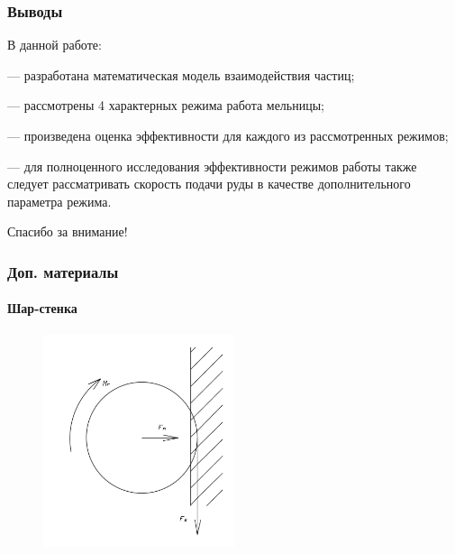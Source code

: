 \documentclass[c]{beamer}  %
\begin{document}
\begin{frame}
\frametitle{Выводы} 
В данной работе:

	--- разработана математическая модель взаимодействия частиц;

	--- рассмотрены 4 характерных режима работа мельницы;

	--- произведена оценка эффективности для каждого из рассмотренных режимов;

	--- для полноценного исследования эффективности режимов работы также следует рассматривать скорость подачи руды в качестве дополнительного параметра режима.

\end{frame}




\begin{frame}
\centering
Спасибо за внимание!
\end{frame}


\begin{frame}
\frametitle{Доп. материалы} 
\framesubtitle{Шар-стенка}

\begin{figure}[h!]
	\centering
	\includegraphics[width=0.5\textwidth]{ball_wall}
\end{figure} 
\end{frame}
\end{document}
